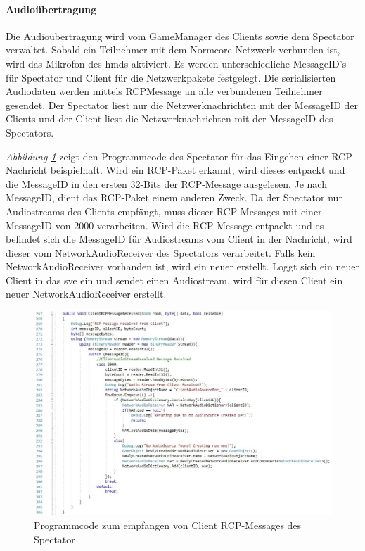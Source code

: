 \documentclass[a4paper,11pt]{article}%
\renewcommand{\\}{\vspace*{0.5\baselineskip} \newline}
\begin{document}
\paragraph{Audioübertragung}
Die Audioübertragung wird vom GameManager des Clients sowie dem Spectator verwaltet. Sobald ein Teilnehmer mit dem Normcore-Netzwerk verbunden ist, wird das Mikrofon des \ac{hmd}s aktiviert. Es werden unterschiedliche MessageID’s für Spectator und Client für die Netzwerkpakete festgelegt. Die serialisierten Audiodaten werden mittels RCPMessage an alle verbundenen Teilnehmer gesendet. Der Spectator liest nur die Netzwerknachrichten mit der MessageID der Clients und der Client liest die Netzwerknachrichten mit der MessageID des Spectators.

\textit{Abbildung \ref{ClientRCPMessageReceived}} zeigt den Programmcode des Spectator für das Eingehen einer RCP-Nachricht beispielhaft. Wird ein RCP-Paket erkannt, wird dieses entpackt und die MessageID in den ersten 32-Bits der RCP-Message ausgelesen. Je nach MessageID, dient das RCP-Paket einem anderen Zweck. Da der Spectator nur Audiostreams des Clients empfängt, muss dieser RCP-Messages mit einer MessageID von \glqq{}2000\dq{} verarbeiten. 
Wird die RCP-Message entpackt und es befindet sich die MessageID für Audiostreams vom Client in der Nachricht, wird dieser vom \glqq{}NetworkAudioReceiver\dq{} des Spectators verarbeitet. Falls kein \glqq{}NetworkAudioReceiver\dq{} vorhanden ist, wird ein neuer erstellt. Loggt sich ein neuer Client in das \ac{sve} ein und sendet einen Audiostream, wird für diesen Client ein neuer \glqq{}NetworkAudioReceiver\dq{} erstellt.

\begin{figure}[H]
		\begin{footnotesize}
		\centering
			\includegraphics[width=\textwidth]{Abbildungen/ClientRCPMessageReceived.jpg}	
			\caption[RCP-Message handling]{Programmcode zum empfangen von Client RCP-Messages des Spectator}
			\label{ClientRCPMessageReceived}
		\end{footnotesize}
	\end{figure}
	
\end{document}

